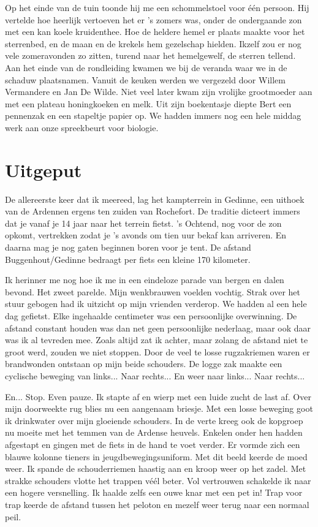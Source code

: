 \documentclass[12pt, justified, a4paper, symmetric]{tufte-book}
\begin{document}
Op het einde van de tuin toonde hij me een schommelstoel voor \'e\'en persoon. Hij vertelde hoe heerlijk vertoeven het er 's zomers was, onder de ondergaande zon met een kan koele kruidenthee. Hoe de heldere hemel er plaats maakte voor het sterrenbed, en de maan en de krekels hem gezelschap hielden. Ikzelf zou er nog vele zomeravonden zo zitten, turend naar het hemelgewelf, de sterren tellend. Aan het einde van de rondleiding kwamen we bij de veranda waar we in de schaduw plaatsnamen. Vanuit de keuken werden we vergezeld door Willem Vermandere en Jan De Wilde. Niet veel later kwam zijn vrolijke grootmoeder aan met een plateau honingkoeken en melk. Uit zijn boekentasje diepte Bert een pennenzak en een stapeltje papier op. We hadden immers nog een hele middag werk aan onze spreekbeurt voor biologie.

\newpage
\section{Uitgeput}
De allereerste keer dat ik meereed, lag het kampterrein in Gedinne, een uithoek van de Ardennen ergens ten zuiden van Rochefort. De traditie dicteert immers dat je vanaf je 14 jaar naar het terrein fietst. 's Ochtend, nog voor de zon opkomt, vertrekken zodat je 's avonds om tien uur bekaf kan arriveren. En daarna mag je nog gaten beginnen boren voor je tent. De afstand Buggenhout/Gedinne bedraagt per fiets een kleine 170 kilometer.

Ik herinner me nog hoe ik me in een eindeloze parade van bergen en dalen bevond. Het zweet parelde. Mijn wenkbrauwen voelden vochtig. Strak over het stuur gebogen had ik uitzicht op mijn vrienden verderop. We hadden al een hele dag gefietst. Elke ingehaalde centimeter was een persoonlijke overwinning. De afstand constant houden was dan net geen persoonlijke nederlaag, maar ook daar was ik al tevreden mee. Zoals altijd zat ik achter, maar zolang de afstand niet te groot werd, zouden we niet stoppen. Door de veel te losse rugzakriemen waren er brandwonden ontstaan op mijn beide schouders. De logge zak maakte een cyclische beweging van links... Naar rechts... En weer naar links... Naar rechts...

En... Stop. Even pauze. Ik stapte af en wierp met een luide zucht de last af. Over mijn doorweekte rug blies nu een aangenaam briesje. Met een losse beweging goot ik drinkwater over mijn gloeiende schouders. In de verte kreeg ook de kopgroep nu moeite met het temmen van de Ardense heuvels. Enkelen onder hen hadden afgestapt en gingen met de fiets in de hand te voet verder. Er vormde zich een blauwe kolonne tieners in jeugdbewegingsuniform. Met dit beeld keerde de moed weer. Ik spande de schouderriemen haastig aan en kroop weer op het zadel. Met strakke schouders vlotte het trappen v\'e\'el beter. Vol vertrouwen schakelde ik naar een hogere versnelling. Ik haalde zelfs een ouwe knar met een pet in! Trap voor trap keerde de afstand tussen het peloton en mezelf weer terug naar een normaal peil.
\end{document}
